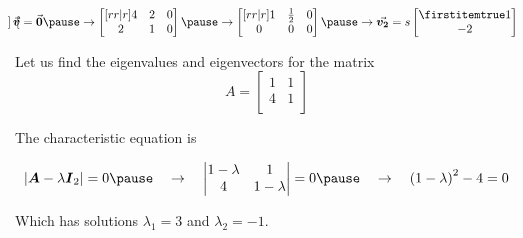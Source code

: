 \documentclass{beamer}
\begin{document}
\begin{frame}
\begin{example}
\begin{equation*}
\begin{bmatrix}
\end{bmatrix}\vect{v}=\vect{0}\pause
\rightarrow
\begin{bmatrix}[rr|r]
4 & 2 & 0 \\
2 & 1 & 0 \\
\end{bmatrix}\pause
\rightarrow
\begin{bmatrix}[rr|r]
1 & \tfrac{1}{2} & 0 \\
0 & 0 & 0 \\
\end{bmatrix}\pause
\rightarrow
\vect{v_2}=s\bvector{1,-2}
\end{equation*}
\end{example}
\end{frame}

\begin{frame}
\begin{example}
Let us find the eigenvalues and eigenvectors for the matrix
\begin{equation*}
A=
\begin{bmatrix}
1 & 1 \\ 
4 & 1 \\
\end{bmatrix}
\end{equation*}\pause

\vspace{-6mm}
The characteristic equation is 

\vspace{-6mm}
\begin{equation*}
\abs{\mat{A}-\lambda\identmat{2}}=0\pause
\quad\rightarrow\quad
\begin{vmatrix}
1-\lambda & 1 \\
4 & 1-\lambda \\
\end{vmatrix}=0\pause
\quad\rightarrow\quad
{(1-\lambda)}^2-4=0
\end{equation*}\pause

\vspace{-4mm}
Which has solutions $\lambda_1=3$ and $\lambda_2=-1$.\pause


\end{example}
\end{frame}
\end{document}
